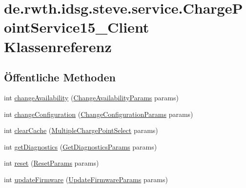 \hypertarget{classde_1_1rwth_1_1idsg_1_1steve_1_1service_1_1_charge_point_service15___client}{\section{de.\-rwth.\-idsg.\-steve.\-service.\-Charge\-Point\-Service15\-\_\-\-Client Klassenreferenz}
\label{classde_1_1rwth_1_1idsg_1_1steve_1_1service_1_1_charge_point_service15___client}
}
\subsection*{Öffentliche Methoden}
\begin{DoxyCompactItemize}
\item 
int \hyperlink{classde_1_1rwth_1_1idsg_1_1steve_1_1service_1_1_charge_point_service15___client_a4cbf52b72240a920b7ca06fda659bca8}{change\-Availability} (\hyperlink{classde_1_1rwth_1_1idsg_1_1steve_1_1web_1_1dto_1_1ocpp12_1_1_change_availability_params}{Change\-Availability\-Params} params)
\item 
int \hyperlink{classde_1_1rwth_1_1idsg_1_1steve_1_1service_1_1_charge_point_service15___client_ad28911fd98b6de3b020a365cac57a6ae}{change\-Configuration} (\hyperlink{classde_1_1rwth_1_1idsg_1_1steve_1_1web_1_1dto_1_1ocpp12_1_1_change_configuration_params}{Change\-Configuration\-Params} params)
\item 
int \hyperlink{classde_1_1rwth_1_1idsg_1_1steve_1_1service_1_1_charge_point_service15___client_a1349f938cb4da9ce1c3a02be58904a51}{clear\-Cache} (\hyperlink{classde_1_1rwth_1_1idsg_1_1steve_1_1web_1_1dto_1_1common_1_1_multiple_charge_point_select}{Multiple\-Charge\-Point\-Select} params)
\item 
int \hyperlink{classde_1_1rwth_1_1idsg_1_1steve_1_1service_1_1_charge_point_service15___client_acd7e66a2c39c83ec2dedec056aa8a9a6}{get\-Diagnostics} (\hyperlink{classde_1_1rwth_1_1idsg_1_1steve_1_1web_1_1dto_1_1common_1_1_get_diagnostics_params}{Get\-Diagnostics\-Params} params)
\item 
int \hyperlink{classde_1_1rwth_1_1idsg_1_1steve_1_1service_1_1_charge_point_service15___client_a418f7209c5ec5aae956ac876ead76a69}{reset} (\hyperlink{classde_1_1rwth_1_1idsg_1_1steve_1_1web_1_1dto_1_1ocpp12_1_1_reset_params}{Reset\-Params} params)
\item 
int \hyperlink{classde_1_1rwth_1_1idsg_1_1steve_1_1service_1_1_charge_point_service15___client_a7f17088a0c28a9bceb391df80a840be1}{update\-Firmware} (\hyperlink{classde_1_1rwth_1_1idsg_1_1steve_1_1web_1_1dto_1_1common_1_1_update_firmware_params}{Update\-Firmware\-Params} params)

\end{DoxyCompactItemize}
